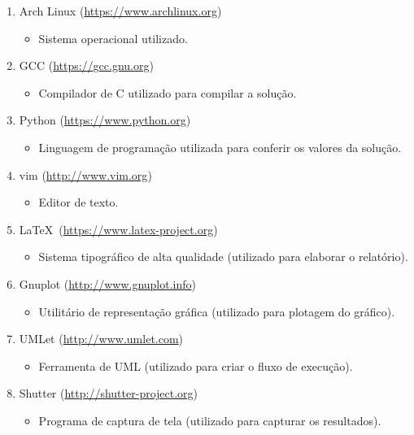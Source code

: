 \documentclass[12pt, hidelinks]{article}
\begin{document}
\begin{enumerate}
  \item Arch Linux (\url{https://www.archlinux.org})
    \begin{itemize}
      \item Sistema operacional utilizado.
    \end{itemize}
  \item GCC (\url{https://gcc.gnu.org})
    \begin{itemize}
      \item Compilador de C utilizado para compilar a solução.
    \end{itemize}
  \item Python (\url{https://www.python.org})
    \begin{itemize}
      \item Linguagem de programação utilizada para conferir os valores da solução.
    \end{itemize}
  \item vim (\url{http://www.vim.org})
    \begin{itemize}
      \item Editor de texto.
    \end{itemize}
  \item \LaTeX~(\url{https://www.latex-project.org})
    \begin{itemize}
      \item Sistema tipográfico de alta qualidade (utilizado para elaborar o relatório).
    \end{itemize}
  \item Gnuplot (\url{http://www.gnuplot.info})
    \begin{itemize}
      \item Utilitário de representação gráfica (utilizado para plotagem do gráfico).
    \end{itemize}
  \item UMLet (\url{http://www.umlet.com})
    \begin{itemize}
      \item Ferramenta de UML (utilizado para criar o fluxo de execução).
    \end{itemize}
  \item Shutter (\url{http://shutter-project.org})
    \begin{itemize}
      \item Programa de captura de tela (utilizado para capturar os resultados).
    \end{itemize}
\end{enumerate}

\end{document}
